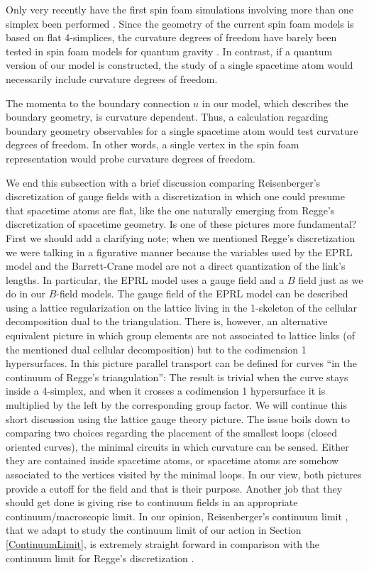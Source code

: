 \documentclass{article}
\begin{document}
Only very recently have the first spin foam simulations involving more than one simplex been performed \cite{ESFM1, SFmoreThan1simplex1, SFmoreThan1simplex2}. Since the geometry of the current spin foam models is based on flat 4-simplices, the curvature degrees of freedom have barely been tested in spin foam models for quantum gravity \cite{Livine}. In contrast, if a quantum version of our model is constructed, the study of a single spacetime atom would necessarily include curvature degrees of freedom. 

The momenta to the boundary connection $u$ in our model, which describes the boundary geometry, is curvature dependent. Thus, a calculation regarding boundary geometry observables for a single spacetime atom would test curvature degrees of freedom. In other words, a single vertex in the spin foam representation would probe curvature degrees of freedom. 

We end this subsection with a brief discussion comparing Reisenberger's discretization of gauge fields with a discretization in which one could presume that spacetime atoms are flat, like the one naturally emerging from Regge's discretization of spacetime geometry. Is one of these pictures more fundamental? 
First we should add a clarifying note; when we mentioned Regge's discretization we were talking in a figurative manner because the variables used by the EPRL model and the Barrett-Crane model are not a direct quantization of the link's lengths. In particular, the EPRL model uses a gauge field and a $B$ field just as we do in our $B$-field models. The gauge field of the EPRL model can be described using a lattice regularization on the lattice living in the 1-skeleton of the cellular decomposition dual to the triangulation. There is, however, an alternative equivalent picture in which group elements are not associated to lattice links (of the mentioned dual cellular decomposition) but to the codimension 1 hypersurfaces. In this picture parallel transport can be defined for curves ``in the continuum of Regge's triangulation'': The result is trivial when the curve stays inside a 4-simplex, and when it crosses a codimension 1 hypersurface it is multiplied by the left by the corresponding group factor. We will continue this short discussion using the lattice gauge theory picture. 
The issue boils down to comparing two choices regarding the placement of the smallest loops (closed oriented curves), the minimal circuits in which curvature can be sensed. Either they are contained inside spacetime atoms, or spacetime atoms are somehow associated to the vertices visited by the minimal loops. In our view, both pictures provide a cutoff for the field and that is their purpose. 
Another job that they should get done is giving rise to continuum fields in an appropriate continuum/macroscopic limit. In our opinion, Reisenberger's continuum limit \cite{Rei1}, that we adapt to study the continuum limit of our action in Section \ref{ContinuumLimit}, is extremely straight forward in comparison with the continuum limit for Regge's discretization \cite{CheegerEtal}. 
\end{document}
